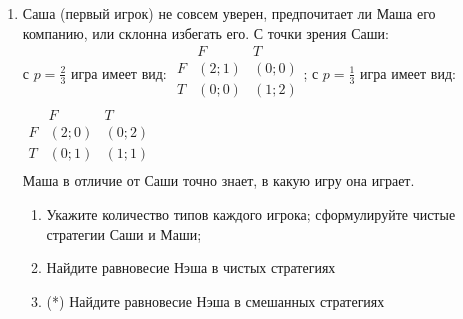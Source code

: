 \documentclass[pdftex,12pt,a4paper]{article}
\begin{document}
\begin{enumerate}

\item Саша (первый игрок) не совсем уверен, предпочитает ли Маша его компанию, или склонна избегать его. С точки зрения Саши:\\
с $p=\frac{2}{3}$ 
 игра имеет вид: $\begin{array}{c|cc}
    {} &  F & T   \\
\hline
    F &  {\left( {2;1} \right)} & {\left( {0;0} \right)}   \\
    T &  {\left( {0;0} \right)} & {\left( {1;2} \right)}   \\
\end{array}$;
с $p=\frac{1}{3}$
 игра имеет вид: $\begin{array}{c|cc}
    {} &  F & T   \\
\hline
    F &  {\left( {2;0} \right)} & {\left( {0;2} \right)}   \\
    T &  {\left( {0;1} \right)} & {\left( {1;1} \right)}   \\
\end{array}$\\
Маша в отличие от Саши точно знает, в какую игру она играет. 
\begin{enumerate}
\item Укажите количество типов каждого игрока; сформулируйте чистые стратегии Саши и Маши;
\item Найдите равновесие Нэша в чистых стратегиях 
\item (*) Найдите равновесие Нэша в смешанных стратегиях  
\end{enumerate}

% 


\end{enumerate}
\end{document}
